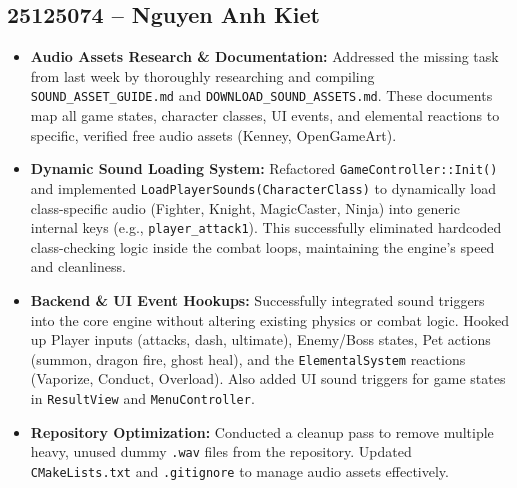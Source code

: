 \documentclass[12pt,a4paper]{article}
\begin{document}
\subsection*{25125074 -- Nguyen Anh Kiet}
\begin{itemize}
    \item \textbf{Audio Assets Research \& Documentation:} Addressed the missing task from last week by thoroughly researching and compiling \texttt{SOUND\_ASSET\_GUIDE.md} and \texttt{DOWNLOAD\_SOUND\_ASSETS.md}. These documents map all game states, character classes, UI events, and elemental reactions to specific, verified free audio assets (Kenney, OpenGameArt).
    
    \item \textbf{Dynamic Sound Loading System:} Refactored \texttt{GameController::Init()} and implemented \texttt{LoadPlayerSounds(CharacterClass)} to dynamically load class-specific audio (Fighter, Knight, MagicCaster, Ninja) into generic internal keys (e.g., \texttt{player\_attack1}). This successfully eliminated hardcoded class-checking logic inside the combat loops, maintaining the engine's speed and cleanliness.
    
    \item \textbf{Backend \& UI Event Hookups:} Successfully integrated sound triggers into the core engine without altering existing physics or combat logic. Hooked up Player inputs (attacks, dash, ultimate), Enemy/Boss states, Pet actions (summon, dragon fire, ghost heal), and the \texttt{ElementalSystem} reactions (Vaporize, Conduct, Overload). Also added UI sound triggers for game states in \texttt{ResultView} and \texttt{MenuController}.
    
    \item \textbf{Repository Optimization:} Conducted a cleanup pass to remove multiple heavy, unused dummy \texttt{.wav} files from the repository. Updated \texttt{CMakeLists.txt} and \texttt{.gitignore} to manage audio assets effectively.
\end{itemize}
\end{document}
